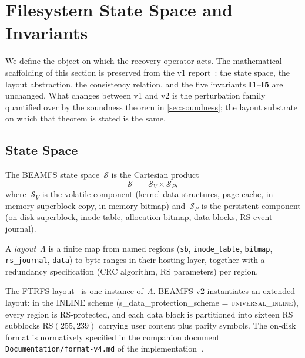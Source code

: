 \section{Filesystem State Space and Invariants}\label{sec:state}

We define the object on which the recovery operator acts. The
mathematical scaffolding of this section is preserved from the v1
report~\cite{desbrieres2026ftrfs}: the state space, the layout
abstraction, the consistency relation, and the five invariants
\textbf{I1}--\textbf{I5} are unchanged. What changes between v1
and v2 is the perturbation family quantified over by the
soundness theorem in \cref{sec:soundness}; the layout
substrate on which that theorem is stated is the same.

\subsection{State Space}

\begin{definition}\label{def:state}
The BEAMFS state space~\(\mathcal{S}\) is the Cartesian product
\[
  \mathcal{S} \;=\; \mathcal{S}_V \times \mathcal{S}_P,
\]
where~\(\mathcal{S}_V\) is the volatile component (kernel data
structures, page cache, in-memory superblock copy, in-memory
bitmap) and~\(\mathcal{S}_P\) is the persistent component (on-disk
superblock, inode table, allocation bitmap, data blocks, RS event
journal).
\end{definition}

\begin{definition}[Layout]\label{def:layout}
A \emph{layout}~\(\Lambda\) is a finite map from named regions
(\texttt{sb}, \texttt{inode\_table}, \texttt{bitmap},
\texttt{rs\_journal}, \texttt{data}) to byte ranges in their
hosting layer, together with a redundancy specification (CRC
algorithm, RS parameters) per region.
\end{definition}

The FTRFS layout~\cite{fuchs2015ftrfs,desbrieres2026ftrfs} is one
instance of~\(\Lambda\). BEAMFS v2 instantiates an extended
layout: in the INLINE scheme (s\_data\_protection\_scheme =
\textsc{universal\_inline}), every region is RS-protected, and
each data block is partitioned into sixteen RS subblocks
\(\mathrm{RS}(255, 239)\) carrying user content plus parity
symbols. The on-disk format is normatively specified in the
companion document \texttt{Documentation/format-v4.md} of the
implementation~\cite{beamfs-impl}.

